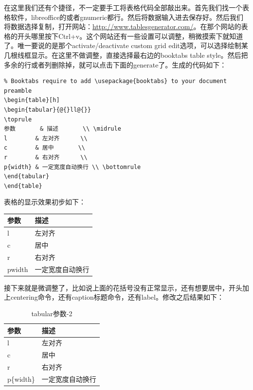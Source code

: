\documentclass[11pt,oneside]{book}
\begin{document}
\begin{common-format}
在这里我们还有个捷径，不一定要手工将表格代码全部敲出来。首先我们找一个表格软件，libreoffice的或者gnumeric都行。然后将数据输入进去保存好。然后我们将数据选择复制，打开网站：\href{http://www.tablesgenerator.com/}{http://www.tablesgenerator.com/}。在那个网站的表格的开头哪里按下Ctrl+v。这个网站还有一些设置可以调整，稍微摸索下就知道了。唯一要说的是那个activate/deactivate custom grid edit选项，可以选择绘制某几根线框显示。在这里不做调整，直接选择最右边的booktabs table style。然后把多余的行或者列删除掉，就可以点击下面的generate了。生成的代码如下：
\begin{Verbatim}
% Booktabs require to add \usepackage{booktabs} to your document preamble
\begin{table}[h]
\begin{tabular}{@{}ll@{}}
\toprule
参数       & 描述       \\ \midrule
l        & 左对齐      \\
c        & 居中       \\
r        & 右对齐      \\
p{width} & 一定宽度自动换行 \\ \bottomrule
\end{tabular}
\end{table}
\end{Verbatim}
表格的显示效果初步如下：
\begin{table}[h]
\begin{tabular}{@{}ll@{}}
\toprule
参数       & 描述       \\ \midrule
l        & 左对齐      \\
c        & 居中       \\
r        & 右对齐      \\
p{width} & 一定宽度自动换行 \\ \bottomrule
\end{tabular}
\end{table}

接下来就是微调整了，比如说上面的花括号没有正常显示，还有想要居中，开头加上centering命令，还有caption标题命令，还有label。修改之后结果如下：
\begin{table}[H]
\centering
\begin{tabular}{@{}ll@{}}
\toprule[1.2pt]
参数       & 描述       \\ \midrule
l        & 左对齐      \\
c        & 居中       \\
r        & 右对齐      \\
p\{width\} & 一定宽度自动换行 \\ \bottomrule[1.2pt]
\end{tabular}
\caption{tabular参数-2}
\label{tab:tabular参数-2}
\end{table}


\end{common-format}
\end{document}
